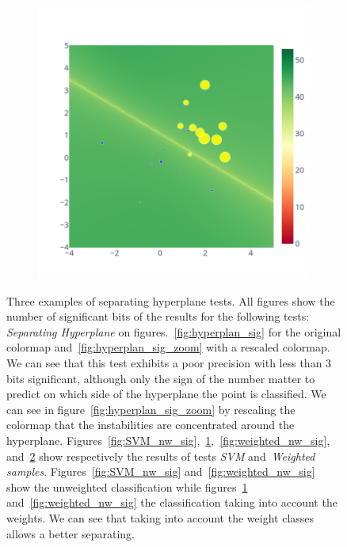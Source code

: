 \documentclass[11pt]{article}
\begin{document}
\begin{figure}
\begin{subfigure}{.3\linewidth}
    \caption{}
    \label{fig:SVM_w_sig}
    \end{subfigure}
    \begin{subfigure}{.3\linewidth}
    \includegraphics[width=\linewidth]{figure/Weighted/weighted.png}
    \caption{}
    \label{fig:weighted_w_sig}
    \end{subfigure}
    \caption{Three examples of separating hyperplane tests.  All figures show the number of significant bits of the results for the following tests: \textit{Separating Hyperplane} on figures.~\ref{fig:hyperplan_sig} for the original colormap and~\ref{fig:hyperplan_sig_zoom} with a rescaled colormap. We can see that this test exhibits a poor precision with less than 3 bits significant, although only the sign of the number matter to predict on which side of the hyperplane the point is classified.
We can see in figure~\ref{fig:hyperplan_sig_zoom} by rescaling the colormap that the instabilities are concentrated around the hyperplane.
    Figures~\ref{fig:SVM_nw_sig},~\ref{fig:SVM_w_sig},~\ref{fig:weighted_nw_sig}, and~\ref{fig:weighted_w_sig} show respectively the results of tests    \textit{SVM} and~\textit{Weighted samples}. Figures~\ref{fig:SVM_nw_sig} and~\ref{fig:weighted_nw_sig} show the unweighted classification while figures~\ref{fig:SVM_w_sig} and~\ref{fig:weighted_nw_sig} the classification taking into account the weights. We can see that taking into account the weight classes allows a better separating.}
\label{fig:my_label}
\end{figure}
\end{document}
